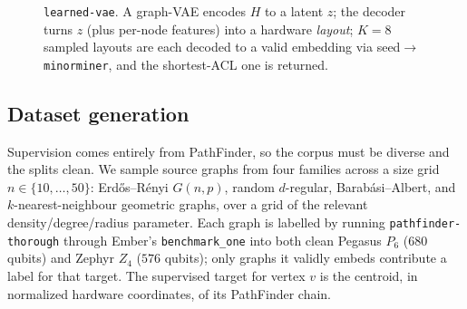 \documentclass[acmsmall,anonymous,nonacm]{acmart}
\begin{document}
\begin{figure}[t]
\centering
{}
\caption{\texttt{learned-vae}. A graph-VAE encodes $H$ to a latent $z$; the decoder
turns $z$ (plus per-node features) into a hardware \emph{layout}; $K{=}8$ sampled
layouts are each decoded to a valid embedding via seed$\to$\texttt{minorminer}, and
the shortest-ACL one is returned.}
\label{fig:vae}
\end{figure}

\subsection{Dataset generation}
\label{sec:learn-data}

Supervision comes entirely from PathFinder, so the corpus must be diverse and the
splits clean. We sample source graphs from four families across a size grid
$n\in\{10,\dots,50\}$: Erd\H{o}s--R\'enyi $G(n,p)$, random $d$-regular,
Barab\'asi--Albert, and $k$-nearest-neighbour geometric graphs, over a grid of the
relevant density/degree/radius parameter. Each graph is labelled by running
\texttt{pathfinder-thorough} through Ember's \texttt{benchmark\_one} into both
clean Pegasus $P_6$ ($680$ qubits) and Zephyr $Z_4$ ($576$ qubits); only graphs it
validly embeds contribute a label for that target. The supervised target for vertex
$v$ is the centroid, in normalized hardware coordinates, of its PathFinder chain.
\end{document}
